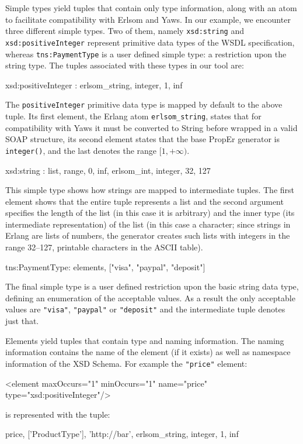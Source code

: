\documentclass[copyright]{eptcs}
\begin{document}
Simple types yield tuples that contain only type information, along
with an atom to facilitate compatibility with Erlsom and Yaws. In our
example, we encounter three different simple types. Two of them,
namely \texttt{xsd:string} and \texttt{xsd:positiveInteger} represent
primitive data types of the WSDL specification, whereas
\texttt{tns:PaymentType} is a user defined simple type: a restriction
upon the string type. The tuples associated with these types in our
tool are:
\begin{lstline}
xsd:positiveInteger : {erlsom_string, integer, {1, inf}}
\end{lstline}
The \texttt{positiveInteger} primitive data type is mapped by default to the
above tuple.  Its first element, the Erlang atom \texttt{erlsom\_string}, states
that for compatibility with Yaws it must be converted to String before wrapped
in a valid SOAP structure, its second element states that the base PropEr
generator is \texttt{integer()}, and the last denotes the range $[1,+\infty)$. 
\begin{lstline}
xsd:string : {list, {{range, 0, inf}, {erlsom_int, integer, {32, 127}}}}
\end{lstline}
This simple type shows how strings are mapped to intermediate tuples.
The first element shows that the entire tuple represents a list and
the second argument specifies the length of the list (in this case it
is arbitrary) and the inner type (its intermediate representation) of
the list (in this case a character; since strings in Erlang are lists
of numbers, the generator creates such lists with integers in the
range 32--127, printable characters in the ASCII table).

\begin{lstline}
tns:PaymentType: {elements, ["visa", "paypal", "deposit"]}
\end{lstline}
The final simple type is a user defined restriction upon the basic
string data type, defining an enumeration of the acceptable values. As
a result the only acceptable values are \texttt{"visa"},
\texttt{"paypal"} or \texttt{"deposit"} and the intermediate tuple
denotes just that.

Elements yield tuples that contain type and naming information. The
naming information contains the name of the element (if it exists) as
well as namespace information of the XSD Schema. For example the
\texttt{"price"} element:
\begin{lstline}
<element maxOccurs="1" minOccurs="1" name="price" type="xsd:positiveInteger"/>
\end{lstline}
is represented with the tuple:
\begin{lstline}
{{price, ['ProductType'], 'http://bar'}, {erlsom_string, integer, {1, inf}}}
\end{lstline}
\end{document}
